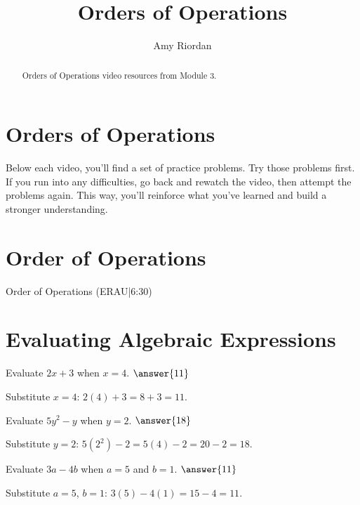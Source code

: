 \documentclass{ximera}
\title{Orders of Operations}
\author{Amy Riordan}
\begin{document}
\begin{abstract}
Orders of Operations video resources from Module 3.
\end{abstract}
\maketitle

\section*{Orders of Operations}

Below each video, you’ll find a set of practice problems. Try those problems first. If you run into any difficulties, go back and rewatch the video, then attempt the problems again. This way, you’ll reinforce what you’ve learned and build a stronger understanding.

\section*{Order of Operations}

Order of Operations (ERAU|6:30)



\section*{Evaluating Algebraic Expressions}

\begin{problem}
Evaluate $2x + 3$ when $x = 4$. $\answer{11}$
\begin{feedback}
Substitute $x = 4$: $2(4) + 3 = 8 + 3 = 11$.
\end{feedback}
\end{problem}

\begin{problem}
Evaluate $5y^2 - y$ when $y = 2$. $\answer{18}$
\begin{feedback}
Substitute $y = 2$: $5(2^2) - 2 = 5(4) - 2 = 20 - 2 = 18$.
\end{feedback}
\end{problem}

\begin{problem}
Evaluate $3a - 4b$ when $a = 5$ and $b = 1$. $\answer{11}$
\begin{feedback}
Substitute $a = 5$, $b = 1$: $3(5) - 4(1) = 15 - 4 = 11$.
\end{feedback}
\end{problem}
\end{document}
